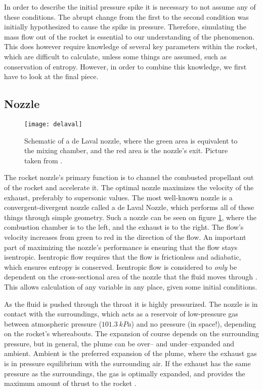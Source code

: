 	In order to describe the initial pressure spike it is necessary to not assume any of these conditions. The abrupt change from the first to the second condition was initially hypothesized to cause the spike in pressure. Therefore, simulating the mass flow out of the rocket is essential to our understanding of the phenomenon. This does however require knowledge of several key parameters within the rocket, which are difficult to calculate, unless some things are assumed, such as conservation of entropy. However, in order to combine this knowledge, we first have to look at the final piece.

\subsection{Nozzle}

	\begin{figure}
		\texttt{[image: delaval]}
		\caption{Schematic of a de Laval nozzle, where the green area is equivalent to the mixing chamber, and the red area is the nozzle's exit. Picture taken from \cite{wikidelaval}.}
		\label{fig:delaval}
	\end{figure}

	The rocket nozzle's primary function is to channel the combusted propellant out of the rocket and accelerate it. The optimal nozzle maximizes the velocity of the exhaust, preferably to supersonic values. The most well-known nozzle is a convergent-divergent nozzle called a de Laval Nozzle, which performs all of these things through simple geometry. Such a nozzle can be seen on figure \ref{fig:delaval}, where the combustion chamber is to the left, and the exhaust is to the right. The flow's velocity increases from green to red in the direction of the flow. An important part of maximizing the nozzle's performance is ensuring that the flow stays isentropic. Isentropic flow requires that the flow is frictionless and adiabatic, which ensures entropy is conserved. Isentropic flow is considered to \emph{only} be dependent on the cross-sectional area of the nozzle that the fluid moves through \cite{nakkanozz}. This allows calculation of any variable in any place, given some initial conditions.

	As the fluid is pushed through the throat it is highly pressurized. The nozzle is in contact with the surroundings, which acts as a reservoir of low-pressure gas between atmospheric pressure ($\SI{101.3}{kPa}$)
	and no pressure (in space!), depending on the rocket's whereabouts. The expansion of course depends on the surrounding pressure, but in general, the plume can be over-- and under--expanded and ambient. Ambient is the preferred expansion of the plume, where the exhaust gas is in pressure equilibrium with the surrounding air. If the exhaust has the same pressure as the surroundings, the gas is optimally expanded, and provides the maximum amount of thrust to the rocket \cite{robertnozzle}.

